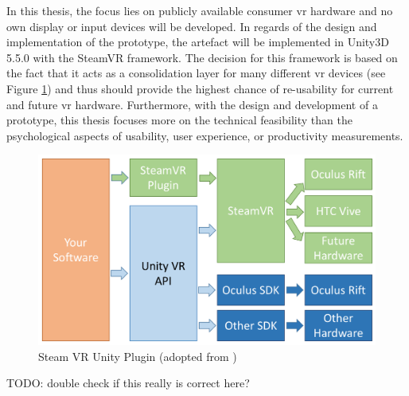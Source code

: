 In this thesis, the focus lies on publicly available consumer \gls{vr} hardware and no own display or input devices will be developed. In regards of the design and implementation of the prototype, the artefact will be implemented in Unity3D 5.5.0 with the SteamVR framework. The decision for this framework is based on the fact that it acts as a consolidation layer for many different \gls{vr} devices (see Figure \ref{fig:steamvr}) and thus should provide the highest chance of re-usability for current and future \gls{vr} hardware. \newline
Furthermore, with the design and development of a prototype, this thesis focuses more on the technical feasibility than the psychological aspects of usability, user experience, or productivity measurements. 
\begin{figure}[h]
	\begin{center}
		\includegraphics[width=14cm]{03_Figures/04_Valve/OpenVR_SteamVR.png}
		\caption[Steam VR Unity Plugin]{Steam VR Unity Plugin (adopted from \cite{Valve2016})}
		\label{fig:steamvr}
	\end{center}
\end{figure}

TODO: double check if this really is correct here?






